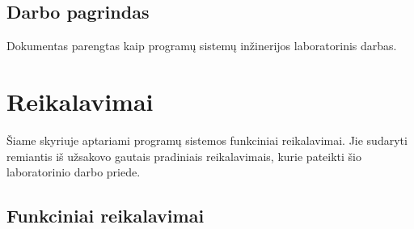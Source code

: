 \documentclass{VUMIFPSkursinis}
\begin{document}
        \subsection*{Darbo pagrindas} \label{ivadas_pagrindas}
            Dokumentas parengtas kaip programų sistemų inžinerijos laboratorinis darbas.
			
    \section{Reikalavimai} \label{reikalavimai}
		Šiame skyriuje aptariami programų sistemos funkciniai reikalavimai. Jie sudaryti remiantis iš užsakovo gautais pradiniais reikalavimais, kurie pateikti šio laboratorinio darbo priede.
        \subsection{Funkciniai reikalavimai} \label{reikalavimai_fr}
\end{document}
